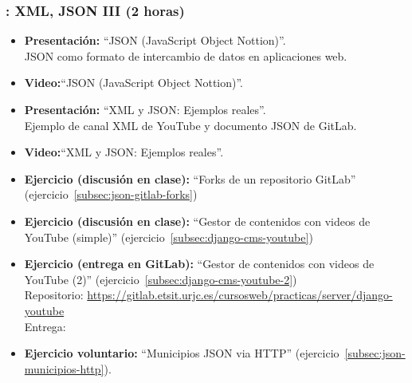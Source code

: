 \documentclass[a4paper,12pt]{article}
\begin{document}
\subsubsection{\juevesK: XML, JSON III (2 horas)}
\label{cal:juevesK}

\begin{itemize}
\item \textbf{Presentación:} ``JSON (JavaScript Object Nottion)''. \\
  JSON como formato de intercambio de datos en aplicaciones web.
\item \textbf{Video:}``JSON (JavaScript Object Nottion)''.
\item \textbf{Presentación:} ``XML y JSON: Ejemplos reales''. \\
  Ejemplo de canal XML de YouTube y documento JSON de GitLab.
\item \textbf{Video:}``XML y JSON: Ejemplos reales''.
\item \textbf{Ejercicio (discusión en clase):} ``Forks de un repositorio GitLab''
  (ejercicio~\ref{subsec:json-gitlab-forks})
\item \textbf{Ejercicio (discusión en clase):} ``Gestor de contenidos con videos de YouTube (simple)'' (ejercicio~\ref{subsec:django-cms-youtube})
\item \textbf{Ejercicio (entrega en GitLab):} ``Gestor de contenidos con videos de YouTube (2)'' (ejercicio~\ref{subsec:django-cms-youtube-2}) \\
  Repositorio: \url{https://gitlab.etsit.urjc.es/cursosweb/practicas/server/django-youtube} \\
  Entrega: \juevesL
\item \textbf{Ejercicio voluntario:} ``Municipios JSON via HTTP'' (ejercicio~\ref{subsec:json-municipios-http}).
\end{itemize}

\end{document}
